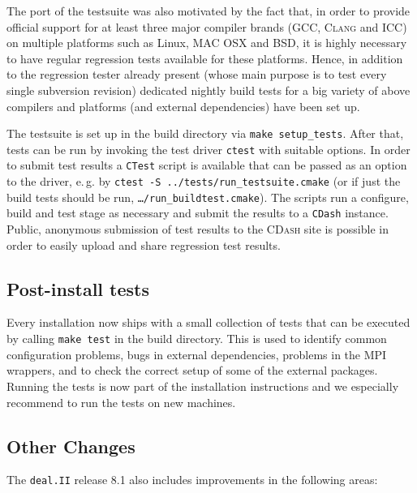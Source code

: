 \documentclass{siamltex}
\newcommand{\specialword}[1]{\texttt{#1}}
\newcommand{\dealii}{{\specialword{deal.II}}}
\begin{document}
The port of the testsuite was also motivated by the fact that, in order to
provide official support for at least three major compiler brands
(\textsc{GCC}, \textsc{Clang} and \textsc{ICC}) on multiple platforms such
as Linux, MAC OSX and BSD, it is highly necessary to have regular
regression tests available for these platforms. Hence, in addition to the
regression tester already present (whose main purpose is to test every
single subversion revision) dedicated nightly build tests for a big variety
of above compilers and platforms (and external dependencies) have been set
up.

The testsuite is set up in the build directory via \texttt{make
setup\_tests}. After that, tests can be run by invoking the test driver
\texttt{ctest} with suitable options. In order to submit test results a
\texttt{CTest} script is available that can be passed as an option to the
driver, e.\,g. by \texttt{ctest -S ../tests/run\_testsuite.cmake} (or if
just the build tests should be run, \texttt{\dots/run\_buildtest.cmake}).
The scripts run a configure, build and test stage as necessary and submit
the results to a \texttt{CDash} instance. Public, anonymous submission
of test results to the \textsc{CDash} site is possible in order to
easily upload and share regression test results.

\subsection{Post-install tests}
\label{sec:installtests}

Every installation now ships with a small collection of tests that can be executed by calling \texttt{make test} in the build directory. This is used to identify common configuration problems, bugs in external dependencies, problems in the MPI wrappers, and to check the correct setup of some of the external packages.
Running the tests is now part of the installation instructions and we especially recommend to run the tests on new machines.

\subsection{Other Changes}\label{sec:other}

The \dealii{} release 8.1 also includes improvements in the following areas:
\end{document}

